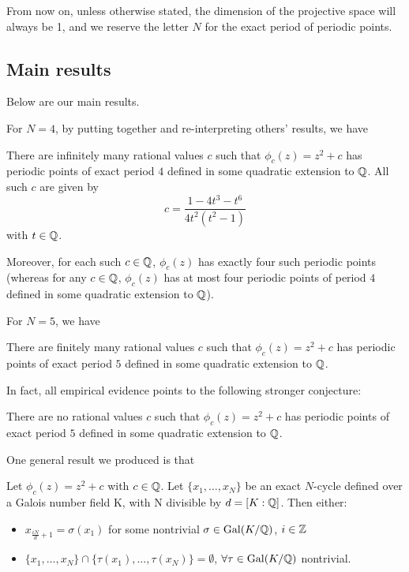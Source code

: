 From now on, unless otherwise stated, the dimension of the projective
space will always be 1, and we reserve the letter $N$ for the exact
period of periodic points.

\subsection{Main results}
\label{subsec:results}

Below are our main results.

For $N = 4$, by putting together and re-interpreting others' results,
we have

\begin{theorem}
  \label{th:n=4-infinite}
  There are infinitely many rational values $c$ such that $\phi_c(z) =
  z^2 + c$ has periodic points of exact period $4$ defined in some
  quadratic extension to $\mathbb{Q}$. All such $c$ are given by
  \[
  c = \frac{1 - 4t^3 - t^6}{4t^2(t^2 - 1)}
  \]
  with $t \in \mathbb{Q}$.

  Moreover, for each such $c \in \mathbb{Q}$, $\phi_c(z)$ has exactly four
  such periodic points (whereas for any $c \in \mathbb{Q}$, $\phi_c(z)$ has
  at most four periodic points of period $4$ defined in some quadratic
  extension to $\mathbb{Q}$).
\end{theorem}

For $N = 5$, we have

\begin{theorem}
  \label{th:n=5-finite}
  There are finitely many rational values $c$ such that $\phi_c(z) =
  z^2 + c$ has periodic points of exact period $5$ defined in some
  quadratic extension to $\mathbb{Q}$.
\end{theorem}

In fact, all empirical evidence points to the following stronger
conjecture:

\begin{conjecture}
  \label{cj:n=5-zero}
  There are no rational values $c$ such that $\phi_c(z) = z^2 + c$ has
  periodic points of exact period $5$ defined in some quadratic
  extension to $\mathbb{Q}$.
\end{conjecture}

One general result we produced is that

\begin{theorem}
	Let $\phi_c(z) = z^2 + c$ with $c \in \mathbb{Q}$. Let $\{x_1, \ldots, x_{N}\}$ be
	an exact $N$-cycle defined over a Galois number field K, with N
	divisible by	$d = [K:\mathbb{Q} ]$. Then either: \\
	\begin{itemize}
	\item $x_{\frac{iN}{d}+1} = \sigma(x_1)$ for some nontrivial $\sigma \in
	\mathrm{Gal}(K/\mathbb{Q})$, $i \in \mathbb{Z}$
	\item $\{x_1, \ldots, x_{N}\} \cap \{\tau(x_1), \ldots, \tau(x_{N})\} =
	\emptyset$, $\forall \tau \in \mathrm{Gal}(K/\mathbb{Q})$ nontrivial.
	\end{itemize}
\end{theorem}

